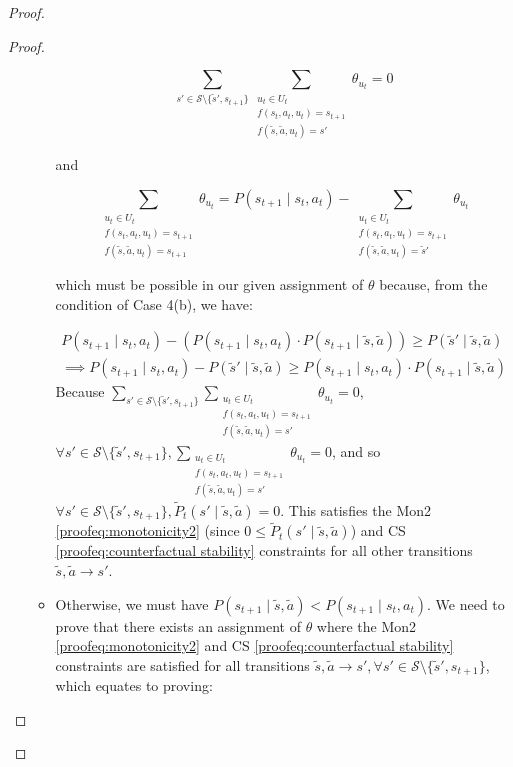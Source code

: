 \begin{proof}
\begin{proof}
\begin{itemize}
\begin{itemize}
        \[
            \sum_{s' \in \mathcal{S}\setminus\{\tilde{s}', s_{t+1}\}}\sum_{\substack{u_t \in U_t \\f(s_t, a_t, u_t) = s_{t+1} \\ f(\tilde{s}, \tilde{a}, u_t) = s'}}{\theta_{u_t}} = 0
        \]

        and 

        \[
            \sum_{\substack{u_t \in U_t \\f(s_t, a_t, u_t) = s_{t+1} \\ f(\tilde{s}, \tilde{a}, u_t) = s_{t+1}}}{\theta_{u_t}} = P(s_{t+1} \mid s_t, a_t) - \sum_{\substack{u_t \in U_t \\f(s_t, a_t, u_t) = s_{t+1} \\ f(\tilde{s}, \tilde{a}, u_t) = \tilde{s}'}}{\theta_{u_t}}
        \]

        which must be possible in our given assignment of $\theta$ because, from the condition of Case 4(b), we have:

        \begin{align*}
            P(s_{t+1} \mid s_t, a_t) - (P(s_{t+1} \mid s_t, a_t) \cdot P(s_{t+1} \mid \tilde{s}, \tilde{a})) \geq P(\tilde{s}' \mid \tilde{s}, \tilde{a}) \\ \implies P(s_{t+1} \mid s_t, a_t) - P(\tilde{s}' \mid \tilde{s}, \tilde{a}) \geq P(s_{t+1} \mid s_t, a_t) \cdot P(s_{t+1} \mid \tilde{s}, \tilde{a})
        \end{align*}
        Because $\sum_{s' \in \mathcal{S}\setminus\{\tilde{s}', s_{t+1}\}}\sum_{\substack{u_t \in U_t \\f(s_t, a_t, u_t) = s_{t+1} \\ f(\tilde{s}, \tilde{a}, u_t) = s'}}{\theta_{u_t}} = 0$, $\forall s' \in \mathcal{S} \setminus \{\tilde{s}', s_{t+1}\}, \sum_{\substack{u_t \in U_t \\f(s_t, a_t, u_t) = s_{t+1} \\ f(\tilde{s}, \tilde{a}, u_t) = s'}}{\theta_{u_t}} = 0$, and so $\forall s' \in \mathcal{S} \setminus \{\tilde{s}', s_{t+1}\}, \tilde{P}_t(s' \mid \tilde{s}, \tilde{a}) = 0$. This satisfies the Mon2 \eqref{proofeq:monotonicity2} (since $0 \leq \tilde{P}_t(s' \mid \tilde{s}, \tilde{a})$) and CS \eqref{proofeq:counterfactual stability} constraints for all other transitions $\tilde{s}, \tilde{a} \rightarrow s'$.

        \item Otherwise, we must have $P(s_{t+1} \mid \tilde{s}, \tilde{a}) < P(s_{t+1} \mid s_t, a_t)$. We need to prove that there exists an assignment of $\theta$ where the Mon2 \eqref{proofeq:monotonicity2} and CS \eqref{proofeq:counterfactual stability} constraints are satisfied for all transitions $\tilde{s}, \tilde{a} \rightarrow s', \forall s' \in \mathcal{S}\setminus \{\tilde{s}', s_{t+1}\}$, which equates to proving:


\end{itemize}
\end{itemize}
\end{proof}
\end{proof}
